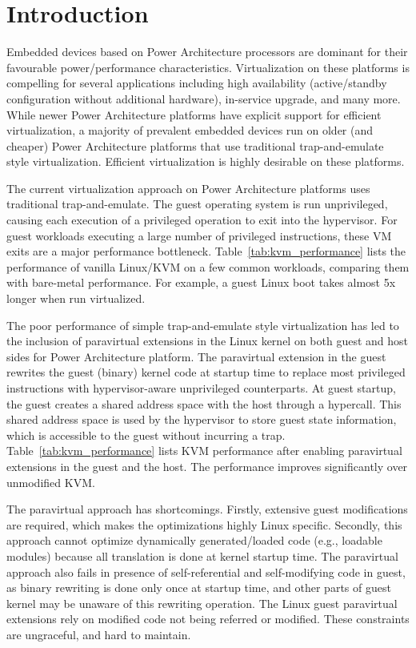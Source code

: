 \chapter{Introduction}\label{ch:1}
Embedded devices based on Power Architecture processors are dominant for their favourable power/performance characteristics. Virtualization on these platforms is compelling for several applications including high availability (active/standby configuration without additional hardware), in-service upgrade, and many more\cite{embedded_virtualization, KVM_on_embedded_Power}. While newer Power Architecture platforms have explicit support for efficient virtualization\cite{freescale_embedded_hyperv, hwassists_hyperv}, a majority of prevalent embedded devices run on older (and cheaper) Power Architecture platforms that use traditional trap-and-emulate style virtualization\cite{popekgoldberg}. Efficient virtualization is highly desirable on these platforms.

The current virtualization approach on Power Architecture platforms uses traditional trap-and-emulate. The guest operating system is run unprivileged, causing each execution of a privileged operation to exit into the hypervisor. For guest workloads executing a large number of privileged instructions, these VM exits are a major performance bottleneck. Table~\ref{tab:kvm_performance} lists the performance of vanilla Linux/KVM on a few common workloads, comparing them with bare-metal performance. For example, a guest Linux boot takes almost 5x longer when run virtualized.

The poor performance of simple trap-and-emulate style virtualization has led to the inclusion of paravirtual extensions in the Linux kernel on both guest and host sides for Power Architecture platform\cite{pvpower}. The paravirtual extension in the guest rewrites the guest (binary) kernel code at startup time to replace most privileged instructions with hypervisor-aware unprivileged counterparts. At guest startup, the guest creates a shared address space with the host through a hypercall. This shared address space is used by the hypervisor to store guest state information, which is accessible to the guest without incurring a trap. Table~\ref{tab:kvm_performance} lists KVM performance after enabling paravirtual extensions in the guest and the host. The performance improves significantly over unmodified KVM.

The paravirtual approach has shortcomings. Firstly, extensive guest modifications are required, which makes the optimizations highly Linux specific. Secondly, this approach cannot optimize dynamically generated/loaded code (e.g., loadable modules) because all translation is done at kernel startup time. The paravirtual approach also fails in presence of self-referential and self-modifying code in guest, as binary rewriting is done only once at startup time, and other parts of guest kernel may be unaware of this rewriting operation. The Linux guest paravirtual extensions rely on modified code not being referred or modified. These constraints are ungraceful, and hard to maintain.

